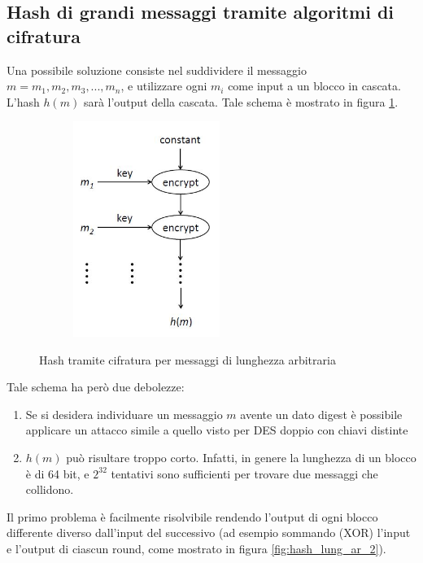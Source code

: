 \subsection{Hash di grandi messaggi tramite algoritmi di cifratura}
Una possibile soluzione consiste nel suddividere il messaggio $m = m_{1},m_{2},m_{3},...,m_{n}$, e utilizzare ogni $m_{i}$ come input a un blocco in cascata. L'hash $h(m)$ sarà l'output della cascata. Tale schema è mostrato in figura \ref{fig:hash_lung_ar}.
\begin{figure}
	\begin{center}
	{\includegraphics[height=7cm, width=7cm, keepaspectratio]{Immagini/hash/schema_des_come_hash_1.JPG}}
	\caption{Hash tramite cifratura per messaggi di lunghezza arbitraria \label{fig:hash_lung_ar}}
	\end{center}
\end{figure}
Tale schema ha però due debolezze:
\begin{enumerate}
\item Se si desidera individuare un messaggio $m$ avente un dato digest è possibile applicare un attacco simile a quello visto per DES doppio con chiavi distinte
\item $h(m)$ può risultare troppo corto. Infatti, in genere la lunghezza di un blocco è di 64 bit, e $2^{32}$ tentativi sono sufficienti per trovare due messaggi che collidono.
\end{enumerate}
Il primo problema è facilmente risolvibile rendendo l'output di ogni blocco differente diverso dall'input del successivo (ad esempio sommando (XOR) l'input e l'output di ciascun round, come mostrato in figura \ref{fig:hash_lung_ar_2}). 
